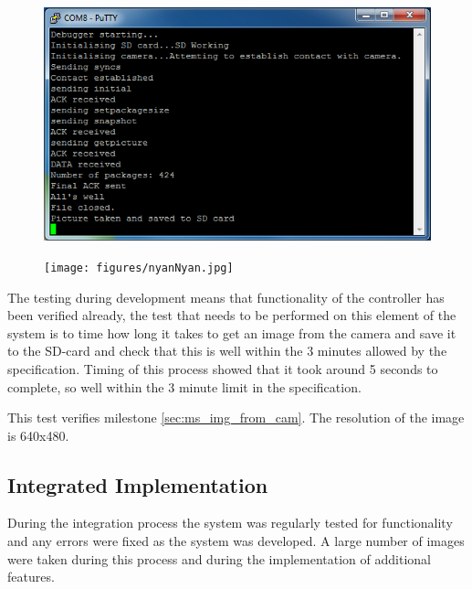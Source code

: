\begin{figure}[H]
        \centering
        \includegraphics[width=1.00\textwidth]{testing_screenshots/camera_image_saving_sd_card_test.png}
        \label{fig:test_camera_image_saving_sd_card}
\end{figure}

\begin{figure}[H]
        \centering
        \texttt{[image: figures/nyanNyan.jpg]}
        \label{fig:Nyan1}
\end{figure}

The testing during development means that functionality of the controller has been verified already, the test that needs to be performed on this element of the system is to time how long it takes to get an image from the camera and save it to the SD-card and check that this is well within the 3 minutes allowed by the specification. Timing of this process showed that it took around 5 seconds to complete, so well within the 3 minute limit in the specification.

This test verifies milestone \ref{sec:ms_img_from_cam}. The resolution of the image is 640x480.

\subsection{Integrated Implementation}
\label{sec:camera_integration_test}

During the integration process the system was regularly tested for functionality and any errors were fixed as the system was developed. A large number of images were taken during this process and during the implementation of additional features.

